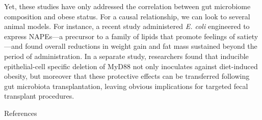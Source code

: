 \documentclass[11pt,letterpaper,final] {article}
\begin{document}
Yet, these studies have only addressed the correlation between gut microbiome composition and obese status. For a causal relationship, we can look to several animal models. For instance, a recent study administered {\itshape E. coli} engineered to express NAPEs---a precursor to a family of lipids that promote feelings of satiety---and found overall reductions in weight gain and fat mass sustained beyond the period of administration. In a separate study, researchers found that inducible epithelial-cell specific deletion of MyD88 not only inoculates against diet-induced obesity, but moreover that these protective effects can be transferred following gut microbiota transplantation, leaving obvious implications for targeted fecal transplant procedures.

\clearpage

\begin{center}
References
\end{center}

\singlespacing
\renewcommand{\labelenumi}{[\arabic{enumi}]}
\linespread{1}
\end{document}
